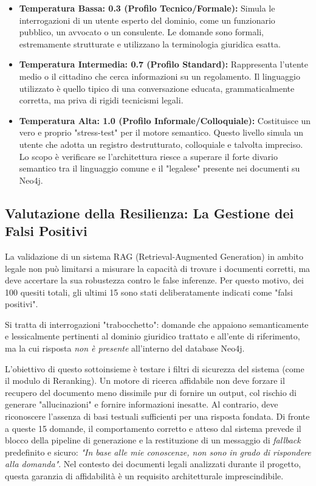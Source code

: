 \begin{itemize}
    \item \textbf{Temperatura Bassa: 0.3 (Profilo Tecnico/Formale):} Simula le interrogazioni di un utente esperto del dominio, come un funzionario pubblico, un avvocato o un consulente. Le domande sono formali, estremamente strutturate e utilizzano la terminologia giuridica esatta.
    \item \textbf{Temperatura Intermedia: 0.7 (Profilo Standard):} Rappresenta l'utente medio o il cittadino che cerca informazioni su un regolamento. Il linguaggio utilizzato è quello tipico di una conversazione educata, grammaticalmente corretta, ma priva di rigidi tecnicismi legali.
    \item \textbf{Temperatura Alta: 1.0 (Profilo Informale/Colloquiale):} Costituisce un vero e proprio "stress-test" per il motore semantico. Questo livello simula un utente che adotta un registro destrutturato, colloquiale e talvolta impreciso. Lo scopo è verificare se l'architettura riesce a superare il forte divario semantico tra il linguaggio comune e il "legalese" presente nei documenti su Neo4j.
\end{itemize}

\subsection{Valutazione della Resilienza: La Gestione dei Falsi Positivi}
La validazione di un sistema RAG (Retrieval-Augmented Generation) in ambito legale non può limitarsi a misurare la capacità di trovare i documenti corretti, ma deve accertare la sua robustezza contro le false inferenze. Per questo motivo, dei 100 quesiti totali, gli ultimi 15 sono stati deliberatamente indicati come "falsi positivi".

Si tratta di interrogazioni "trabocchetto": domande che appaiono semanticamente e lessicalmente pertinenti al dominio giuridico trattato e all'ente di riferimento, ma la cui risposta \textit{non è presente} all'interno del database Neo4j. 

L'obiettivo di questo sottoinsieme è testare i filtri di sicurezza del sistema (come il modulo di Reranking). Un motore di ricerca affidabile non deve forzare il recupero del documento meno dissimile pur di fornire un output, col rischio di generare "allucinazioni" e fornire informazioni inesatte. Al contrario, deve riconoscere l'assenza di basi testuali sufficienti per una risposta fondata. Di fronte a queste 15 domande, il comportamento corretto e atteso dal sistema prevede il blocco della pipeline di generazione e la restituzione di un messaggio di \textit{fallback} predefinito e sicuro: \textit{"In base alle mie conoscenze, non sono in grado di rispondere alla domanda"}. Nel contesto dei documenti legali analizzati durante il progetto, questa garanzia di affidabilità è un requisito architetturale imprescindibile.


